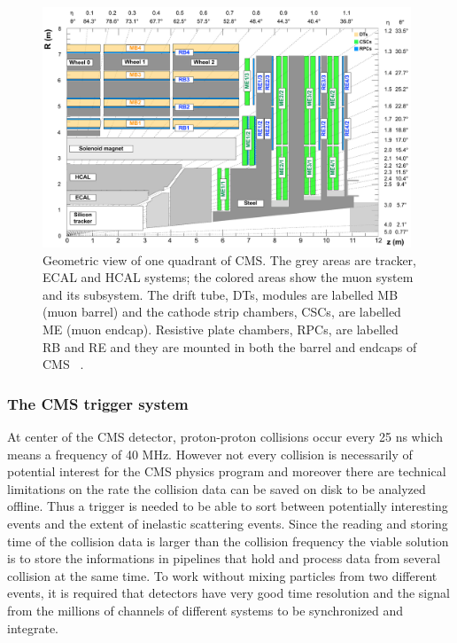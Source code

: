 \begin{figure}[h]
\centering
\includegraphics[width=0.98\textwidth]{Figures/c2/cms_quadrant_run_ii.pdf}
\caption{Geometric view of one quadrant of CMS. The grey areas are
  tracker, ECAL and HCAL systems; the colored
  areas show the muon system and its subsystem. The drift tube, DTs,
  modules are labelled MB (muon barrel) and the cathode strip
  chambers, CSCs, are labelled ME (muon endcap). Resistive plate
  chambers, RPCs, are labelled RB and RE and they are mounted in both the barrel and endcaps of CMS
~\cite{muonsystemPU}. }
\label{fig:muonsystem}
\end{figure} 

\subsubsection{The CMS trigger system}\label{sec:triggersystem}

At center of the CMS detector, proton-proton collisions occur every
25 ns which means a frequency of 40 MHz. However not every collision is
necessarily of potential interest for the CMS physics program and
moreover there are technical limitations on the rate the collision data can be
saved on disk to be analyzed offline. Thus a trigger is needed to be
able to sort between potentially interesting events and the extent of
inelastic scattering events.
Since the reading and storing time of the collision data is larger
than the collision frequency the viable solution is
to store the informations in pipelines that hold and process data
from several collision at the same time.
To work without mixing particles from two different events, it is
required that detectors have very good time
resolution and the signal from the millions of channels of different
systems to be synchronized and integrate.

